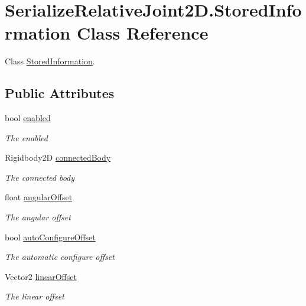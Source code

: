 \hypertarget{class_serialize_relative_joint2_d_1_1_stored_information}{}\section{Serialize\+Relative\+Joint2\+D.\+Stored\+Information Class Reference}
\label{class_serialize_relative_joint2_d_1_1_stored_information}


Class \hyperlink{class_serialize_relative_joint2_d_1_1_stored_information}{Stored\+Information}.  


\subsection*{Public Attributes}
\begin{DoxyCompactItemize}
\item 
bool \hyperlink{class_serialize_relative_joint2_d_1_1_stored_information_a4c6e1a2ee067b5e8efd7b7138d2ede47}{enabled}
\begin{DoxyCompactList}\small\item\em The enabled \end{DoxyCompactList}\item 
Rigidbody2D \hyperlink{class_serialize_relative_joint2_d_1_1_stored_information_a882928ad112685836396480619a83412}{connected\+Body}
\begin{DoxyCompactList}\small\item\em The connected body \end{DoxyCompactList}\item 
float \hyperlink{class_serialize_relative_joint2_d_1_1_stored_information_ad3cd683f4c04ea46c857456599c7fe5c}{angular\+Offset}
\begin{DoxyCompactList}\small\item\em The angular offset \end{DoxyCompactList}\item 
bool \hyperlink{class_serialize_relative_joint2_d_1_1_stored_information_a1161e388d52033b3cb94a5de869d46bc}{auto\+Configure\+Offset}
\begin{DoxyCompactList}\small\item\em The automatic configure offset \end{DoxyCompactList}\item 
Vector2 \hyperlink{class_serialize_relative_joint2_d_1_1_stored_information_aec22e67aa7fd628a8a7fb571659792a5}{linear\+Offset}
\begin{DoxyCompactList}\small\item\em The linear offset \end{DoxyCompactList}\end{DoxyCompactItemize}



